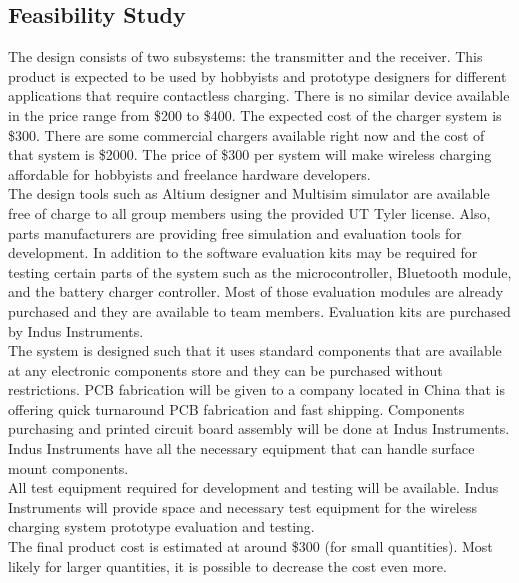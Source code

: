 \documentclass[12pt]{article}
\begin{document}
\subsection{Feasibility Study}

\indent \indent
The design consists of two subsystems: the transmitter and the receiver. This product is expected to be used by hobbyists and prototype designers for different applications that require contactless charging. There is no similar device available in the price range from \$200 to \$400.  The expected cost of the charger system is \$300. There are some commercial chargers available right now and the cost of that system is \$2000. The price of \$300 per system will make wireless charging affordable for hobbyists and freelance hardware developers.\\

\indent
The design tools such as Altium designer and Multisim simulator are available free of charge to all group members using the provided UT Tyler license. Also, parts manufacturers are providing free simulation and evaluation tools for development. In addition to the software evaluation kits may be required for testing certain parts of the system such as the microcontroller, Bluetooth module, and the battery charger controller. Most of those evaluation modules are already purchased and they are available to team members. Evaluation kits are purchased by Indus Instruments.\\

\indent
The system is designed such that it uses standard components that are available at any electronic components store and they can be purchased without restrictions. PCB fabrication will be given to a company located in China that is offering quick turnaround PCB fabrication and fast shipping. Components purchasing and printed circuit board assembly will be done at Indus Instruments. Indus Instruments have all the necessary equipment that can handle surface mount components.\\

\indent
All test equipment required for development and testing will be available. Indus Instruments will provide space and necessary test equipment for the wireless charging system prototype evaluation and testing.\\

\indent
The final product cost is estimated at around \$300 (for small quantities). Most likely for larger quantities, it is possible to decrease the cost even more. 
\end{document}

